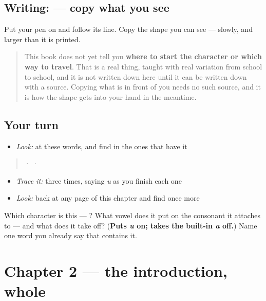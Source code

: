 \subsection*{Writing:  — copy what you see}
Put your pen on  and follow its line. Copy the shape you can see — slowly, and larger than it is printed.

\begin{quote}
This book does not yet tell you \textbf{where to start the character or which way to travel}. That is a real thing, taught with real variation from school to school, and it is not written down here until it can be written down with a source. Copying what is in front of you needs no such source, and it is how the shape gets into your hand in the meantime.
\end{quote}

\subsection*{Your turn}
\begin{itemize}
\raggedright
  \item \emph{Look:} at these words, and find  in the ones that have it
\end{itemize}

\begin{quote}
  ·    ·  
\end{quote}

\begin{itemize}
\raggedright
  \item \emph{Trace it:}  three times, saying \emph{u} as you finish each one
  \item \emph{Look:} back at any page of this chapter and find  once more
\end{itemize}

\begin{tcolorbox}[breakable,colback=teal!4,colframe=teal!35!black,title={Before you move on}]
Which character is this — ? What vowel does it put on the consonant it attaches to — and what does it take off? (\textbf{Puts \emph{u} on; takes the built-in \emph{a} off.}) Name one word you already say that contains it.
\end{tcolorbox}
\section[Practice]{Chapter 2 — the introduction, whole}

